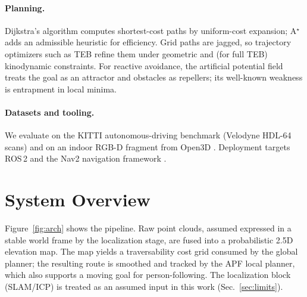 \documentclass[11pt]{article}
\begin{document}
\paragraph{Planning.} Dijkstra's algorithm \cite{dijkstra1959} computes
shortest-cost paths by uniform-cost expansion; A$^\star$ \cite{hart1968} adds an
admissible heuristic for efficiency. Grid paths are jagged, so trajectory
optimizers such as TEB \cite{rosmann2012,rosmann2017} refine them under geometric
and (for full TEB) kinodynamic constraints. For reactive avoidance, the artificial
potential field \cite{khatib1986} treats the goal as an attractor and obstacles as
repellers; its well-known weakness is entrapment in local minima.

\paragraph{Datasets and tooling.} We evaluate on the KITTI autonomous-driving
benchmark \cite{geiger2012,geiger2013} (Velodyne HDL-64 scans) and on an indoor
RGB-D fragment from Open3D \cite{zhou2018}. Deployment targets ROS\,2 and the Nav2
navigation framework \cite{quigley2009,macenski2020,macenski2022}.

\section{System Overview}
\label{sec:overview}

Figure~\ref{fig:arch} shows the pipeline. Raw point clouds, assumed expressed in a
stable world frame by the localization stage, are fused into a probabilistic 2.5D
elevation map. The map yields a traversability cost grid consumed by the global
planner; the resulting route is smoothed and tracked by the APF local planner,
which also supports a moving goal for person-following. The localization block
(SLAM/ICP) is treated as an assumed input in this work (Sec.~\ref{sec:limits}).
\end{document}
